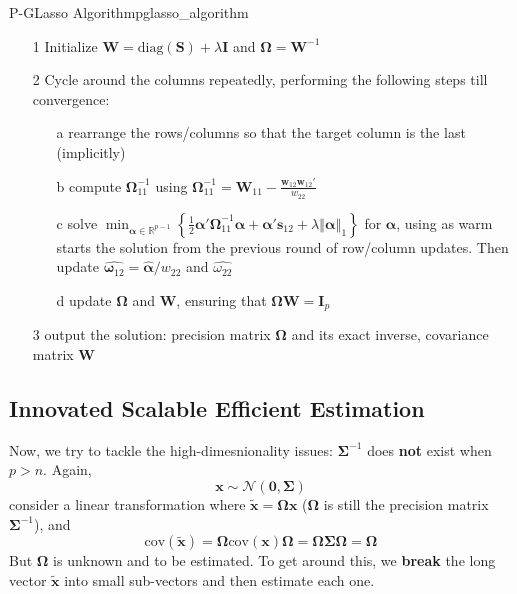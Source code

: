 \documentclass[twoside]{article}
\begin{document}
\begin{algorithm}{P-GLasso Algorithm}{pglasso_algorithm}
    \begin{itemize}
        \item[1] Initialize $\mathbf{W} = \mathrm{diag}(\mathbf{S}) + \lambda\mathbf{I}$ and $\boldsymbol{\Omega} = \mathbf{W}^{-1}$
        \item[2] Cycle around the columns repeatedly, performing the following steps till convergence:
        \begin{itemize}
            \item[a] rearrange the rows/columns so that the target column is the last (implicitly)
            \item[b] compute $\mathbf{\Omega}^{-1}_{11}$ using $\boldsymbol{\Omega}^{-1}_{11}=\mathbf{W}_{11}-\frac{\mathbf{w}_{12}\mathbf{w}_{12}'}{w_{22}}$
            \item[c] solve $\min_{\boldsymbol{\alpha}\in\mathbb{R}^{p-1}}\left\{ \frac{1}{2}\boldsymbol{\alpha'\Omega}_{11}^{-1}\boldsymbol{\alpha} + \boldsymbol{\alpha}'\mathbf{s}_{12} + \lambda\left\Vert \boldsymbol{\alpha}\right\Vert _1 \right\} $ for $\boldsymbol{\alpha}$, using as warm starts the solution from the previous round of row/column updates. Then update $\hat{\boldsymbol{\omega}_{12}} = \hat{\boldsymbol{\alpha}}/w_{22}$ and $\hat{\omega_{22}}$
            \item[d] update $\boldsymbol{\Omega}$ and $\mathbf{W}$, ensuring that $\boldsymbol{\Omega}\mathbf{W} = \mathbf{I}_p$
        \end{itemize}
        \item[3] output the solution: precision matrix $\boldsymbol{\Omega}$ and its exact inverse, covariance matrix $\mathbf{W}$
    \end{itemize}
\end{algorithm}

\subsection{Innovated Scalable Efficient Estimation}
Now, we try to tackle the high-dimesnionality issues: $\boldsymbol{\Sigma}^{-1}$ does \textbf{not} exist when $p>n$. Again, 
$$
\mathbf{x} \sim \mathcal{N}(\mathbf{0},\boldsymbol{\Sigma})
$$
consider a linear transformation where $\tilde{\mathbf{x}} = \boldsymbol{\Omega}\mathbf{x}$ ($\boldsymbol{\Omega}$ is still the precision matrix $\boldsymbol{\Sigma}^{-1}$), and 
$$
\mathrm{cov}(\tilde{\mathbf{x}}) = \boldsymbol{\Omega}\mathrm{cov}(\mathbf{x})\boldsymbol{\Omega} = \boldsymbol{\Omega}\boldsymbol{\Sigma}\boldsymbol{\Omega}=\boldsymbol{\Omega}
$$
But $\boldsymbol{\Omega}$ is unknown and to be estimated. To get around this, we \textbf{break} the long vector $\tilde{\mathbf{x}}$ into small sub-vectors and then estimate each one.
\end{document}
